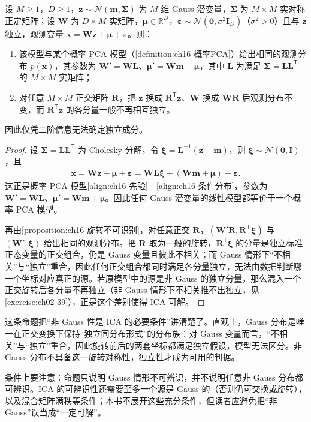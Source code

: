 \documentclass[../../main.tex]{subfiles}
\begin{document}
\begin{proposition}\label{proposition:ch16-Gauss不可辨识}
设 $M\geqslant1$，$D\geqslant1$，$\bm{z}\sim\mathcal{N}(\bm{m},\bm{\Sigma})$ 为 $M$ 维 Gauss 潜变量，$\bm{\Sigma}$ 为 $M\times M$ 实对称正定矩阵；设 $\bm{W}$ 为 $D\times M$ 实矩阵，$\bm{\mu}\in\mathbb{R}^{D}$，$\bm{\varepsilon}\sim\mathcal{N}(\bm{0},\sigma^2\bm{I}_D)$（$\sigma^2>0$）且与 $\bm{z}$ 独立，观测变量 $\bm{x}=\bm{W}\bm{z}+\bm{\mu}+\bm{\varepsilon}$。则：
\begin{enumerate}
\item 该模型与某个概率 PCA 模型（\cref{definition:ch16-概率PCA}）给出相同的观测分布 $p(\bm{x})$，其参数为 $\bm{W}'=\bm{W}\bm{L}$、$\bm{\mu}'=\bm{W}\bm{m}+\bm{\mu}$，其中 $\bm{L}$ 为满足 $\bm{\Sigma}=\bm{L}\bm{L}^{\mathsf T}$ 的 $M\times M$ 实矩阵；
\item 对任意 $M\times M$ 正交矩阵 $\bm{R}$，把 $\bm{z}$ 换成 $\bm{R}^{\mathsf T}\bm{z}$、$\bm{W}$ 换成 $\bm{W}\bm{R}$ 后观测分布不变，而 $\bm{R}^{\mathsf T}\bm{z}$ 的各分量一般不再相互独立。
\end{enumerate}
因此仅凭二阶信息无法确定独立成分。
\end{proposition}

\begin{proof}
设 $\bm{\Sigma}=\bm{L}\bm{L}^{\mathsf T}$ 为 Cholesky 分解，令 $\bm{\xi}=\bm{L}^{-1}(\bm{z}-\bm{m})$，则 $\bm{\xi}\sim\mathcal{N}(\bm{0},\bm{I})$，且
\begin{align*}
  \bm{x}=\bm{W}\bm{z}+\bm{\mu}+\bm{\varepsilon}=\bm{W}\bm{L}\bm{\xi}+(\bm{W}\bm{m}+\bm{\mu})+\bm{\varepsilon}.
\end{align*}
这正是概率 PCA 模型\eqref{align:ch16-先验}—\eqref{align:ch16-条件分布}，参数为 $\bm{W}'=\bm{W}\bm{L}$、$\bm{\mu}'=\bm{W}\bm{m}+\bm{\mu}$。因此任何 Gauss 潜变量的线性模型都等价于一个概率 PCA 模型。

再由\cref{proposition:ch16-旋转不可识别}，对任意正交 $\bm{R}$，$(\bm{W}'\bm{R},\bm{R}^{\mathsf T}\bm{\xi})$ 与 $(\bm{W}',\bm{\xi})$ 给出相同的观测分布。把 $\bm{R}$ 取为一般的旋转，$\bm{R}^{\mathsf T}\bm{\xi}$ 的分量是独立标准正态变量的正交组合，仍是 Gauss 变量且彼此不相关；而 Gauss 情形下“不相关”与“独立”重合，因此任何正交组合都同时满足各分量独立，无法由数据判断哪一个坐标对应真正的源。若原模型中的源是非 Gauss 的独立分量，那么混入一个正交旋转后各分量不再独立（非 Gauss 情形下不相关推不出独立，见\cref{exercise:ch02-39}），正是这个差别使得 ICA 可解。
\end{proof}

\begin{remark}
这条命题把“非 Gauss 性是 ICA 的必要条件”讲清楚了。直观上，Gauss 分布是唯一在正交变换下保持“独立同分布形式”的分布族：对 Gauss 变量而言，“不相关”与“独立”重合，因此旋转前后的两套坐标都满足独立假设，模型无法区分。非 Gauss 分布不具备这一旋转对称性，独立性才成为可用的判据。

条件上要注意：命题只说明 Gauss 情形不可辨识，并不说明任意非 Gauss 分布都可辨识。ICA 的可辨识性还需要至多一个源是 Gauss 的（否则仍可交换或旋转），以及混合矩阵满秩等条件；本书不展开这些充分条件，但读者应避免把“非 Gauss”误当成“一定可解”。
\end{remark}
\end{document}
